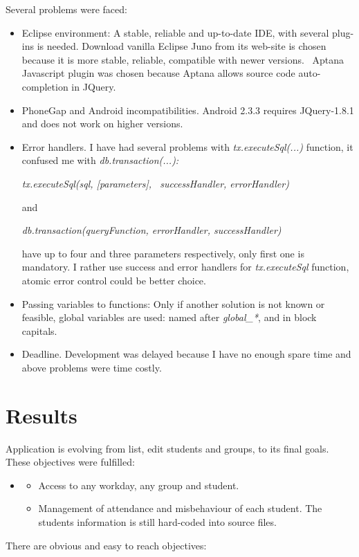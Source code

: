 \documentclass[a4paper]{article}
\begin{document}
Several problems were faced:

\begin{itemize}
\item Eclipse environment: A stable, reliable and up-to-date IDE, with
several plug-ins is needed. Download vanilla Eclipse Juno from its
web-site is chosen because it is more stable, reliable, compatible with
newer versions. \ Aptana Javascript plugin was chosen because Aptana
allows source code auto-completion in JQuery.
\item PhoneGap and Android incompatibilities. Android 2.3.3 requires
JQuery-1.8.1 and does not work on higher versions. 
\item Error handlers. I have had several problems with
\textit{tx.executeSql(...)} function, it confused me with
\textit{db.transaction(...): }

{\itshape
tx.executeSql(sql, [parameters], \ successHandler, errorHandler)}

and

{\itshape
db.transaction(queryFunction, errorHandler, successHandler) \ }

have up to four and three parameters respectively, only first one is
mandatory. I rather use success and error handlers for
\textit{tx.executeSql} function, atomic error control could be better
choice.
\item Passing variables to functions: Only if another solution is not
known or feasible, global variables are used: named after
\textit{global\_*}, and in block capitals.
\item Deadline. Development was delayed because I have no enough spare
time and above problems were time costly.
\end{itemize}
\section{}
\clearpage\section[Results]{Results}
\hypertarget{RefHeading114181570052158}{}Application is evolving from
list, edit students and groups, to its final goals. These objectives
were fulfilled:

\begin{itemize}
\item \begin{itemize}
\item Access to any workday, any group and student.
\item Management of attendance and misbehaviour of each student. The
students information is still hard-coded into source files.
\end{itemize}
\end{itemize}
There are obvious and easy to reach objectives:
\end{document}

